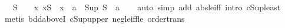 \begin{isabellebody}
\ \ \ {\isachardoublequoteopen}S\ {\isasymnoteq}\ {\isacharbraceleft}{\kern0pt}{\isacharbraceright}{\kern0pt}\ {\isasymLongrightarrow}\ {\isacharparenleft}{\kern0pt}{\isasymAnd}x{\isachardot}{\kern0pt}\ x{\isasymin}S\ {\isasymLongrightarrow}\ {\isasymbar}x{\isasymbar}\ {\isasymle}\ a{\isacharparenright}{\kern0pt}\ {\isasymLongrightarrow}\ {\isasymbar}Sup\ S{\isasymbar}\ {\isasymle}\ a{\isachardoublequoteclose}\isanewline
%
\isadelimproof
\ \ %
\endisadelimproof
%
\isatagproof
{}\isamarkupfalse%
\ {\isacharparenleft}{\kern0pt}auto\ simp\ add{\isacharcolon}{\kern0pt}\ abs{\isacharunderscore}{\kern0pt}le{\isacharunderscore}{\kern0pt}iff\ intro{\isacharcolon}{\kern0pt}\ cSup{\isacharunderscore}{\kern0pt}least{\isacharparenright}{\kern0pt}\isanewline
\ \ \isamarkupfalse%
\ {\isacharparenleft}{\kern0pt}metis\ bdd{\isacharunderscore}{\kern0pt}aboveI\ cSup{\isacharunderscore}{\kern0pt}upper\ neg{\isacharunderscore}{\kern0pt}le{\isacharunderscore}{\kern0pt}iff{\isacharunderscore}{\kern0pt}le\ order{\isacharunderscore}{\kern0pt}trans{\isacharparenright}{\kern0pt}%
\endisatagproof
{\isafoldproof}%
%
\isadelimproof
\isanewline
%
\endisadelimproof
%
\isadelimtheory
\isanewline
%
\endisadelimtheory
%
\isatagtheory
{}\isamarkupfalse%
%
\endisatagtheory
{\isafoldtheory}%
%
\isadelimtheory
%
\endisadelimtheory
%
\end{isabellebody}%
\endinput
